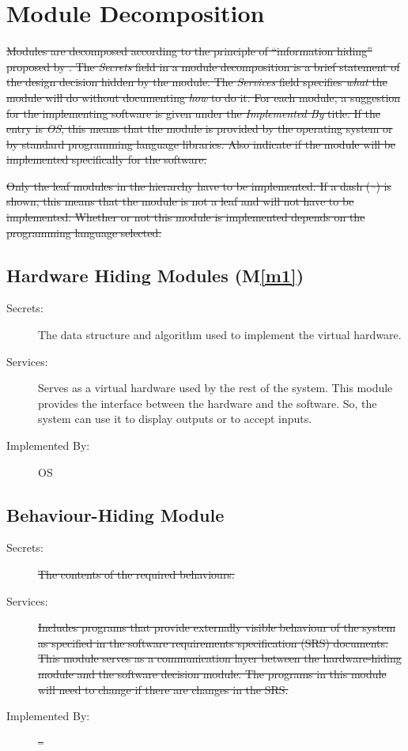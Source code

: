 \documentclass[12pt, titlepage]{article}
\newcommand{\mref}[1]{M\ref{#1}}
\begin{document}
\section{Module Decomposition} \label{SecMD}
\sout{Modules are decomposed according to the principle of ``information hiding'' proposed by \mbox{\citet{ParnasEtAl1984}}. The \emph{Secrets} field in a module decomposition is a brief statement of the design decision hidden by the module. The \emph{Services} field specifies \emph{what} the module will do without documenting \emph{how} to do it. For each module, a suggestion for the implementing software is given under the \emph{Implemented By} title. If the entry is \emph{OS}, this means that the module is provided by the operating system or by standard programming language libraries.  Also indicate if the module will be implemented specifically for the software.}

\sout{Only the leaf modules in the hierarchy have to be implemented. If a dash (\emph{--}) is shown, this means that the module is not a leaf and will not have to be implemented. Whether or not this module is implemented depends on the programming language selected.}

\subsection{Hardware Hiding Modules (\mref{m1})}
\begin{description}
    \item[Secrets:] The data structure and algorithm used to implement the virtual hardware.
    \item[Services:] Serves as a virtual hardware used by the rest of the system. This module provides the interface between the hardware and the software. So, the system can use it to display outputs or to accept inputs.
    \item[Implemented By:] OS
\end{description}

\subsection{Behaviour-Hiding Module}

\begin{description}
\item[Secrets:] \sout{The contents of the required behaviours.}
\item[Services:] \sout{Includes programs that provide externally visible behaviour of the system as specified in the software requirements specification (SRS) documents. This module serves as a communication layer between the hardware-hiding module and the software decision module. The programs in this module will need to change if there are changes in the SRS.}
\item[Implemented By:] \sout{--}
\end{description}
\end{document}
